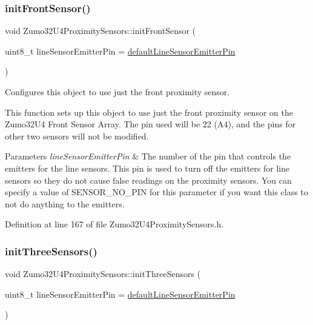 \subsubsection{\texorpdfstring{init\+Front\+Sensor()}{initFrontSensor()}}
{\footnotesize\ttfamily void Zumo32\+U4\+Proximity\+Sensors\+::init\+Front\+Sensor (\begin{DoxyParamCaption}\item[{uint8\+\_\+t}]{line\+Sensor\+Emitter\+Pin = {\ttfamily \hyperlink{class_zumo32_u4_proximity_sensors_a7d6a79ab499972b36c52d2a8c03fe0f7}{default\+Line\+Sensor\+Emitter\+Pin}} }\end{DoxyParamCaption})\hspace{0.3cm}{\ttfamily [inline]}}



Configures this object to use just the front proximity sensor. 

This function sets up this object to use just the front proximity sensor on the Zumo32\+U4 Front Sensor Array. The pin used will be 22 (A4), and the pins for other two sensors will not be modified.


\begin{DoxyParams}{Parameters}
{\em line\+Sensor\+Emitter\+Pin} & The number of the pin that controls the emitters for the line sensors. This pin is used to turn off the emitters for line sensors so they do not cause false readings on the proximity sensors. You can specify a value of S\+E\+N\+S\+O\+R\+\_\+\+N\+O\+\_\+\+P\+IN for this parameter if you want this class to not do anything to the emitters. \\
\hline
\end{DoxyParams}


Definition at line 167 of file Zumo32\+U4\+Proximity\+Sensors.\+h.

\mbox{\label{class_zumo32_u4_proximity_sensors_a521c7fe0992317c0566ff59ec132b469}} 
\subsubsection{\texorpdfstring{init\+Three\+Sensors()}{initThreeSensors()}}
{\footnotesize\ttfamily void Zumo32\+U4\+Proximity\+Sensors\+::init\+Three\+Sensors (\begin{DoxyParamCaption}\item[{uint8\+\_\+t}]{line\+Sensor\+Emitter\+Pin = {\ttfamily \hyperlink{class_zumo32_u4_proximity_sensors_a7d6a79ab499972b36c52d2a8c03fe0f7}{default\+Line\+Sensor\+Emitter\+Pin}} }\end{DoxyParamCaption})\hspace{0.3cm}{\ttfamily [inline]}}



